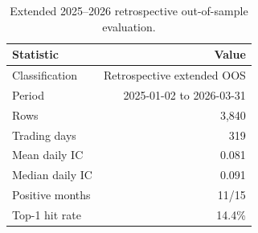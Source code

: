 \begin{table}[t]
\centering
\caption{Extended 2025--2026 retrospective out-of-sample evaluation.}
\label{tab:extended_oos}
\small
\begin{tabular}{@{}lr@{}}
\toprule
Statistic & Value \\
\midrule
Classification & Retrospective extended OOS \\
Period & 2025-01-02 to 2026-03-31 \\
Rows & 3,840 \\
Trading days & 319 \\
Mean daily IC & 0.081 \\
Median daily IC & 0.091 \\
Positive months & 11/15 \\
Top-1 hit rate & 14.4\% \\
\bottomrule
\end{tabular}
\end{table}
